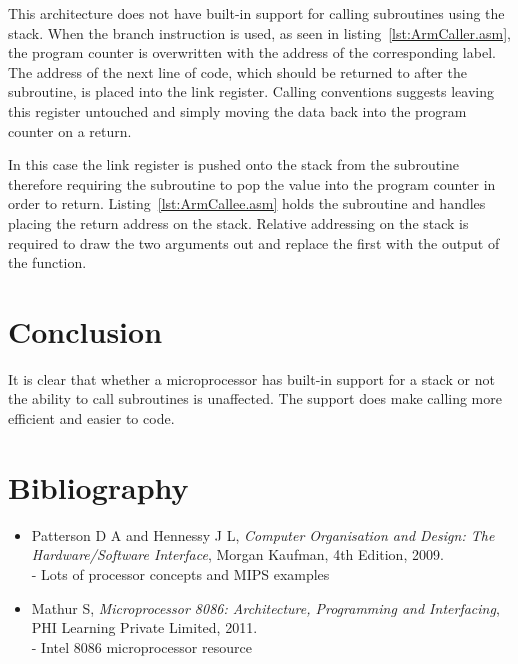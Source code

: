 \documentclass[12pt,a4paper]{article}
\begin{document}
This architecture does not have built-in support for calling subroutines using the stack.
When the branch instruction is used, as seen in listing~\ref{lst:ArmCaller.asm}, the program counter is overwritten with the address of the corresponding label.
The address of the next line of code, which should be returned to after the subroutine, is placed into the link register.
Calling conventions suggests leaving this register untouched and simply moving the data back into the program counter on a return.


In this case the link register is pushed onto the stack from the subroutine therefore requiring the subroutine to pop the value into the program counter in order to return.
Listing~\ref{lst:ArmCallee.asm} holds the subroutine and handles placing the return address on the stack.
Relative addressing on the stack is required to draw the two arguments out and replace the first with the output of the function.







\section{Conclusion}

It is clear that whether a microprocessor has built-in support for a stack or not the ability to call subroutines is unaffected.
The support does make calling more efficient and easier to code. 

\newpage




\makeatletter 
	\renewcommand\@biblabel[1]{\textbullet}
\makeatother

\section*{Bibliography}

\begin{itemize}
   \item{
      Patterson D A and Hennessy J L,
      \emph{Computer Organisation and Design: The Hardware/Software Interface},
      Morgan Kaufman,
      4th Edition,
      2009.\\
      - Lots of processor concepts and MIPS examples
   }
   \item{
      Mathur S,
      \emph{Microprocessor 8086: Architecture, Programming and Interfacing},
      PHI Learning Private Limited,
      2011.\\
      - Intel 8086 microprocessor resource
   }
\end{itemize}
\end{document}
